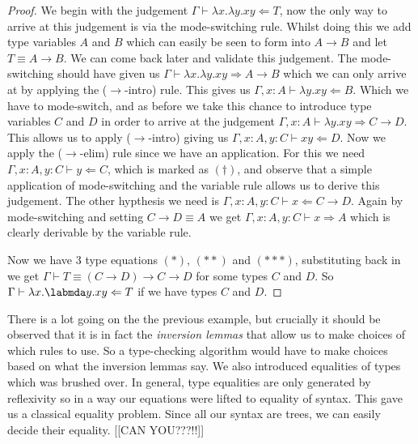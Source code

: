 \begin{example}
        \begin{proof}
        We begin with the judgement $\Gamma \vdash \lambda x . \lambda y . x y \Leftarrow T$, now the only way to arrive at this judgement is via the mode-switching rule. Whilst doing this we add type variables $A$ and $B$ which can easily be seen to form into $A \to B$ and let $T \equiv A \to B$. We can come back later and validate this judgement. The mode-switching should have given us $\Gamma \vdash \lambda x . \lambda y . x y \Rightarrow A \to B$ which we can only arrive at by applying the ($\to$-intro) rule. This gives us $\Gamma , x : A \vdash \lambda y . xy \Leftarrow B$. Which we have to mode-switch, and as before we take this chance to introduce type variables $C$ and $D$ in order to arrive at the judgement $\Gamma , x : A \vdash \lambda y . x y \Rightarrow C \to D$. This allows us to apply ($\to$-intro) giving us $\Gamma , x : A , y : C \vdash xy \Leftarrow D$. Now we apply the ($\to$-elim) rule since we have an application. For this we need $\Gamma , x : A, y : C \vdash y \Leftarrow C$, which is marked as $(\dagger)$, and observe that a simple application of mode-switching and the variable rule allows us to derive this judgement. The other hypthesis we need is $\Gamma , x : A, y : C \vdash x \Leftarrow C \to D$. Again by mode-switching and setting $C \to D \equiv A$ we get $\Gamma , x : A, y : C \vdash x \Rightarrow A$ which is clearly derivable by the variable rule. 
        
        
        Now we have 3 type equations $(*)$, $(**)$ and $(***)$, substituting back in we get $\Gamma \vdash T \equiv (C \to D) \to C \to D$ for some types $C$ and $D$. So $\Gamma \vdash \lambda x . \labmda y . x y \Leftarrow T$ if we have types $C$ and $D$.
        \end{proof}
\end{example}

\begin{remark}
    There is a lot going on the the previous example, but crucially it should be observed that it is in fact the \emph{inversion lemmas} that allow us to make choices of which rules to use. So a type-checking algorithm would have to make choices based on what the inversion lemmas say. We also introduced equalities of types which was brushed over. In general, type equalities are only generated by reflexivity so in a way our equations were lifted to equality of syntax. This gave us a classical equality problem. Since all our syntax are trees, we can easily decide their equality. [[CAN YOU???!!]]
\end{remark}


